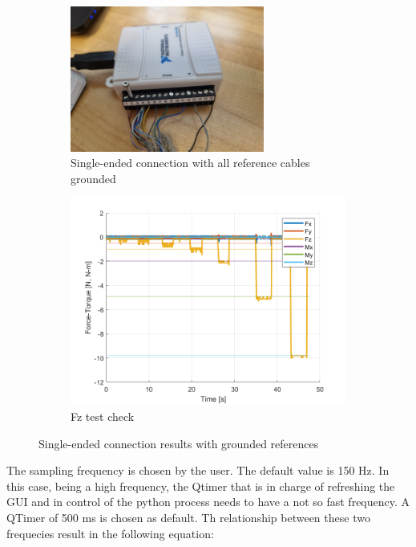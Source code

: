 \documentclass[a4paper]{article}
\begin{document}
\begin{figure}[h!]
	\begin{subfigure}{.5\textwidth}
		\centering
		\includegraphics[width=0.7\textwidth,angle=180]{NIUSB6008_ATIMini40Connection_grounded.jpg}
		\caption{Single-ended connection with all reference cables grounded}
		\label{fig:NIUSB6008_ATIMini40Connection}
	\end{subfigure}%
	\begin{subfigure}{.5\textwidth}
		\centering
		\includegraphics[width=.8\linewidth]{Forces_check50Hz_grounded.png}
		\caption{Fz test check}
		\label{fig:Forces_check50Hz_grounded}
	\end{subfigure}
	\caption{Single-ended connection results with grounded references}
	\label{fig:test2}
\end{figure}


The sampling frequency is chosen by the user. The default value is 150 Hz. In this case, being a high frequency, the Qtimer that is in charge of refreshing the GUI and in control of the python process needs to have a not so fast frequency. A QTimer of 500 ms is chosen as default. Th relationship between these two frequecies result in the following equation:
\end{document}
